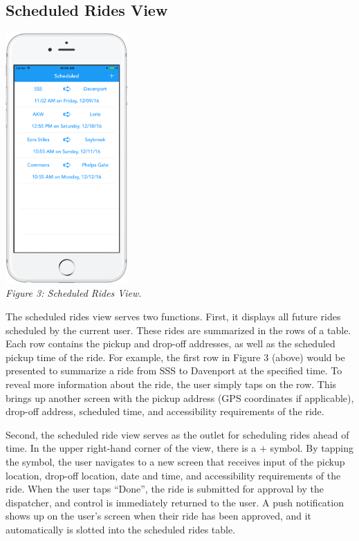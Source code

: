 \documentclass[12pt, a4paper]{article}
\begin{document}
\begin{multicols*}{2}
\subsection{Scheduled Rides View}
\begin{center}
	\includegraphics[width=0.35\textwidth]{screenshot-3.png}\\
	\textit{Figure 3: Scheduled Rides View.}
\end{center}
The scheduled rides view serves two functions. First, it displays all future rides scheduled by the current user. These rides are summarized in the rows of a table. Each row contains the pickup and drop-off addresses, as well as the scheduled pickup time of the ride. For example, the first row in Figure 3 (above) would be presented to summarize a ride from SSS to Davenport at the specified time. To reveal more information about the ride, the user simply taps on the row. This brings up another screen with the pickup address (GPS coordinates if applicable), drop-off address, scheduled time, and accessibility requirements of the ride.

Second, the scheduled ride view serves as the outlet for scheduling rides ahead of time. In the upper right-hand corner of the view, there is a $+$ symbol. By tapping the symbol, the user navigates to a new screen that receives input of the pickup location, drop-off location, date and time, and accessibility requirements of the ride. When the user taps ``Done'', the ride is submitted for approval by the dispatcher, and control is immediately returned to the user. A push notification shows up on the user's screen when their ride has been approved, and it automatically is slotted into the scheduled rides table.

\end{multicols*}
\end{document}
